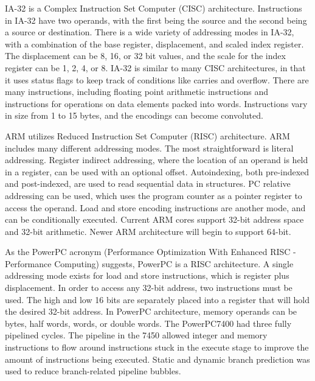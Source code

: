 \documentclass[letterpaper,10pt,titlepage,twocolumn]{article}
\begin{document}
IA-32 is a Complex Instruction Set Computer (CISC) architecture.
Instructions in IA-32 have two operands, with the first being the source and the second being a source or destination.
There is a wide variety of addressing modes in IA-32, with a combination of the base register, displacement, and scaled index register.
The displacement can be 8, 16, or 32 bit values, and the scale for the index register can be 1, 2, 4, or 8.
IA-32 is similar to many CISC architectures, in that it uses status flags to keep track of conditions like carries and overflow.
There are many instructions, including floating point arithmetic instructions and instructions for operations on data elements packed into words.
Instructions vary in size from 1 to 15 bytes, and the encodings can become convoluted.
\newline
\par

ARM utilizes Reduced Instruction Set Computer (RISC) architecture.
ARM includes many different addressing modes.
The most straightforward is literal addressing.
Register indirect addressing, where the location of an operand is held in a register, can be used with an optional offset.
Autoindexing, both pre-indexed and post-indexed, are used to read sequential data in structures.
PC relative addressing can be used, which uses the program counter as a pointer register to access the operand.
Load and store encoding instructions are another mode, and can be conditionally executed.
Current ARM cores support 32-bit address space and 32-bit arithmetic.
Newer ARM architecture will begin to support 64-bit.
\newline
\par

As the PowerPC acronym (Performance Optimization With Enhanced RISC - Performance Computing) suggests, PowerPC is a RISC architecture.
A single addressing mode exists for load and store instructions, which is register plus displacement.
In order to access any 32-bit address, two instructions must be used.
The high and low 16 bits are separately placed into a register that will hold the desired 32-bit address.
In PowerPC architecture, memory operands can be bytes, half words, words, or double words.
The PowerPC7400 had three fully pipelined cycles.
The pipeline in the 7450 allowed integer and memory instructions to flow around instructions stuck in the execute stage to improve the amount of instructions being executed.
Static and dynamic branch prediction was used to reduce branch-related pipeline bubbles.
\newline
\par
\end{document}
